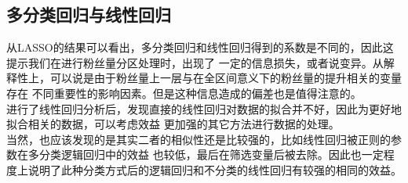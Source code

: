 \documentclass{ctexart}
\begin{document}
\subsection{多分类回归与线性回归}
从LASSO的结果可以看出，多分类回归和线性回归得到的系数是不同的，因此这提示我们在进行粉丝量分区处理时，出现了
一定的信息损失，或者说变异。从解释性上，可以说是由于粉丝量上一层与在全区间意义下的粉丝量的提升相关的变量存在
不同重要性的影响因素。但是这种信息造成的偏差也是值得注意的。\\
\indent 进行了线性回归分析后，发现直接的线性回归对数据的拟合并不好，因此为更好地拟合相关的数据，可以考虑效益
更加强的其它方法进行数据的处理。\\
\indent 当然，也应该发现的是其实二者的相似性还是比较强的，比如线性回归被正则的参数在多分类逻辑回归中的效益
也较低，最后在筛选变量后被去除。因此也一定程度上说明了此种分类方式后的逻辑回归和不分类的线性回归有较强的相同的效益。
\end{document}
